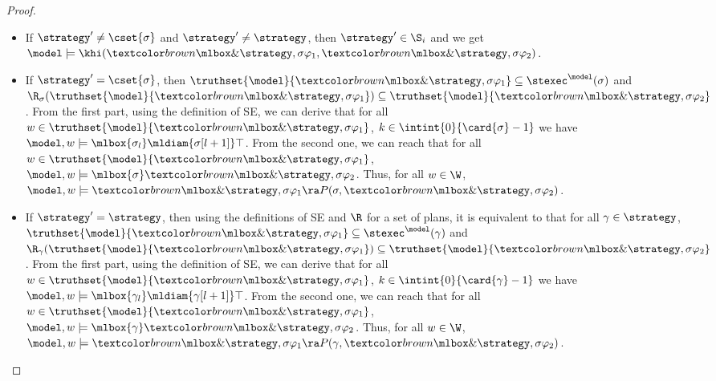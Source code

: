 \begin{proof}
\begin{itemize}
\item If $\strategy' \neq \cset{\sigma}$ and $\strategy' \neq \strategy$, then $\strategy' \in \S_i$ and we get $\model \models \khi(\extraopw{\strategy,\sigma}\varphi_1,\extraopw{\strategy,\sigma}\varphi_2)$.
\item If $\strategy' = \cset{\sigma}$, then $\truthset{\model}{\extraopw{\strategy,\sigma}\varphi_1} \subseteq \stexec^\model(\sigma)$ and $\R_\sigma(\truthset{\model}{\extraopw{\strategy,\sigma}\varphi_1}) \subseteq \truthset{\model}{\extraopw{\strategy,\sigma}\varphi_2}$.
From the first part, using the definition of SE, we can derive that for all $w \in \truthset{\model}{\extraopw{\strategy,\sigma}\varphi_1}$, $k \in \intint{0}{\card{\sigma}-1}$ we have $\model,w \models \mlbox{\sigma_l}\mldiam{\sigma[l+1]}\top$.
From the second one, we can reach that for all $w \in \truthset{\model}{\extraopw{\strategy,\sigma}\varphi_1}$, $\model,w \models \mlbox{\sigma} \extraopw{\strategy,\sigma}\varphi_2$.
Thus, for all $w \in \W$, $\model,w \models \extraopw{\strategy,\sigma} \varphi_1 \ra P(\sigma,\extraopw{\strategy,\sigma}\varphi_2)$.
\item If $\strategy' = \strategy$, then using the definitions of SE and $\R$ for a set of plans, it is equivalent to that for all $\gamma \in \strategy$, $\truthset{\model}{\extraopw{\strategy,\sigma}\varphi_1} \subseteq \stexec^\model(\gamma)$ and $\R_\gamma(\truthset{\model}{\extraopw{\strategy,\sigma}\varphi_1}) \subseteq \truthset{\model}{\extraopw{\strategy,\sigma}\varphi_2}$.
From the first part, using the definition of SE, we can derive that for all $w \in \truthset{\model}{\extraopw{\strategy,\sigma}\varphi_1}$, $k \in \intint{0}{\card{\gamma}-1}$ we have $\model,w \models \mlbox{\gamma_l}\mldiam{\gamma[l+1]}\top$.
From the second one, we can reach that for all $w \in \truthset{\model}{\extraopw{\strategy,\sigma}\varphi_1}$, $\model,w \models \mlbox{\gamma} \extraopw{\strategy,\sigma}\varphi_2$.
Thus, for all $w \in \W$, $\model,w \models \extraopw{\strategy,\sigma} \varphi_1 \ra P(\gamma,\extraopw{\strategy,\sigma}\varphi_2)$.
\end{itemize}


\end{proof}
